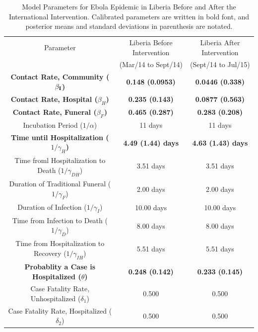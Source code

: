 \begin{table}[ht]
\caption{Model Parameters for Ebola Epidemic in Liberia Before and After the International Intervention. Calibrated parameters are written in bold font, and posterior means and standard deviations in parenthesis are notated.} %
\centering %
\begin{tabular}{c c c }
\hline\hline %
Parameter & Liberia Before Intervention  & Liberia After Intervention \\ [0.5ex]
 & (Mar/14 to Sept/14) &  (Sept/14 to Jul/15) \\ [0.5ex] %
\hline %
\bf {Contact Rate, Community  ($\bf{\beta_{I}}$) }& \bf{0.148 (0.0953)} & \bf{0.0446 (0.338)}  \\
\bf Contact Rate, Hospital  ($\beta_{H}$) &\bf 0.235 (0.143)& \bf 0.0877 (0.563) \\
\bf Contact Rate, Funeral  ($\beta_{F}$) & \bf 0.465 (0.287)& \bf 0.283 (0.208) \\
Incubation Period (${1}/{\alpha}$) & 11 days & 11 days  \\
\bf Time until Hospitalization (${1}/{\gamma_{H}}$) &\bf 4.49 (1.44) days & \bf 4.63 (1.43) days  \\
Time froml Hospitalization to Death (${1}/{\gamma_{DH}}$) & 3.51 days & 3.51 days  \\
Duration of Traditional Funeral (${1}/{\gamma_{F}}$) & 2.00 days & 2.00 days  \\
Duration of Infection (${1}/{\gamma_{I}}$) & 10.00 days & 10.00 days  \\
Time from Infection to Death (${1}/{\gamma_{D}}$) & 8.00 days & 8.00 days  \\
Time from Hospitalization to Recovery (${1}/{\gamma_{IH}}$) & 5.51 days & 5.51 days  \\
\bf Probablity a Case is Hospitalized ($\theta$) & \bf 0.248 (0.142) & \bf 0.233 (0.145) \\
Case Fatality Rate, Unhospitalized ($\delta_{1}$) & 0.500  & 0.500  \\
Case Fatality Rate, Hospitalized ($\delta_{2}$) & 0.500 & 0.500 \\ [1ex]
\hline
\end{tabular}
\label{tab:parameters}
\end{table}


